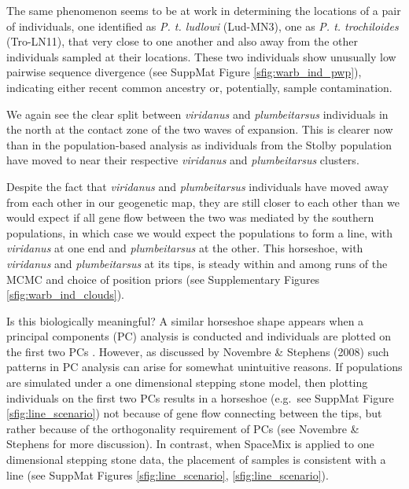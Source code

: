 \documentclass[12pt]{article}
\begin{document}
The same phenomenon seems to be at work in determining the locations of a pair of individuals, one identified as \textit{P. t. ludlowi} (Lud-MN3), one as \textit{P. t. trochiloides} (Tro-LN11), that very close to one another and also away from the other individuals sampled at their locations. These two individuals show unusually low pairwise sequence divergence (see SuppMat Figure \ref{sfig:warb_ind_pwp}), indicating either recent common ancestry or, potentially, sample contamination.

We again see the clear split between \textit{viridanus} and \textit{plumbeitarsus} individuals in the north at the contact zone of the two waves of expansion.  This is clearer now than in the population-based analysis as individuals from the Stolby population have moved to near their respective \textit{viridanus} and \textit{plumbeitarsus} clusters. 

Despite the fact that \textit{viridanus} and \textit{plumbeitarsus} individuals have moved away from each other in our geogenetic map, 
they are still closer to each other than we would expect if all gene flow between the two was mediated by the southern populations,
in which case we would expect the populations to form a line, 
with \textit{viridanus} at one end and \textit{plumbeitarsus} at the other. 
This horseshoe, with \textit{viridanus} and \textit{plumbeitarsus} at its tips, is steady within and among runs of the MCMC and choice of position priors (see Supplementary Figures \ref{sfig:warb_ind_clouds}).  

Is this biologically meaningful?  A similar horseshoe shape appears when a principal components (PC) analysis is conducted and individuals are plotted on the first two PCs \citep[][see SuppMat Figure \ref{sfig:warb_ind_PC_map}]{alcaide2014genomic}.  However, as discussed by Novembre \& Stephens (2008) such patterns in PC analysis can arise for somewhat unintuitive reasons. If populations are simulated under a one dimensional stepping stone model, then plotting individuals on the first two PCs results in a horseshoe (e.g.\ see SuppMat Figure \ref{sfig:line_scenario}) not because of gene flow connecting between the tips, but rather because of the orthogonality requirement of PCs (see Novembre \& Stephens for more discussion).  In contrast, when SpaceMix is applied to one dimensional stepping stone data, the placement of samples is consistent with a line (see SuppMat Figures \ref{sfig:line_scenario}, \ref{sfig:line_scenario}).
\end{document}
